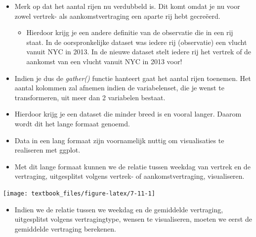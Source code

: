 \documentclass[]{tufte-book}
\newenvironment{Shaded}{}{}
\newcommand{\DataTypeTok}[1]{\textcolor[rgb]{0.56,0.13,0.00}{#1}}
\newcommand{\KeywordTok}[1]{\textcolor[rgb]{0.00,0.44,0.13}{\textbf{#1}}}
\newcommand{\NormalTok}[1]{#1}
\newcommand{\OperatorTok}[1]{\textcolor[rgb]{0.40,0.40,0.40}{#1}}
\newcommand{\StringTok}[1]{\textcolor[rgb]{0.25,0.44,0.63}{#1}}
\providecommand{\tightlist}{%
  \setlength{\itemsep}{0pt}\setlength{\parskip}{0pt}}
\begin{document}
\begin{itemize}
\tightlist
\item
  Merk op dat het aantal rijen nu verdubbeld is. Dit komt omdat je nu voor zowel vertrek- als aankomstvertraging een aparte rij hebt gecreëerd.

  \begin{itemize}
  \tightlist
  \item
    Hierdoor krijg je een andere definitie van de observatie die in een rij staat. In de oorspronkelijke dataset was iedere rij (observatie) een vlucht vanuit NYC in 2013. In de nieuwe dataset stelt iedere rij het vertrek of de aankomst van een vlucht vanuit NYC in 2013 voor!
  \end{itemize}
\item
  Indien je dus de \emph{gather()} functie hanteert gaat het aantal rijen toenemen. Het aantal kolommen zal afnemen indien de variabelenset, die je wenst te transformeren, uit meer dan 2 variabelen bestaat.
\item
  Hierdoor krijg je een dataset die minder breed is en vooral langer. Daarom wordt dit het lange formaat genoemd.
\item
  Data in een lang formaat zijn voornamelijk nuttig om visualisaties te realiseren met ggplot.
\item
  Met dit lange formaat kunnen we de relatie tussen weekdag van vertrek en de vertraging, uitgesplitst volgens vertrek- of aankomstvertraging, visualiseren.
\end{itemize}

\begin{Shaded}
\end{Shaded}

\texttt{[image: textbook\_files/figure-latex/7-11-1]}

\begin{itemize}
\tightlist
\item
  Indien we de relatie tussen we weekdag en de gemiddelde vertraging, uitgesplitst volgens vertragingtype, wensen te visualiseren, moeten we eerst de gemiddelde vertraging berekenen.
\end{itemize}
\end{document}
